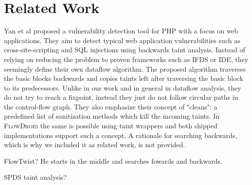 \documentclass[../draft.tex]{subfiles}
\begin{document}
    \chapter{Related Work}
    Yan et al \cite{Yan2017} proposed a vulnerability detection tool for PHP with a focus on web applications. They aim to detect typical web application vulnerabilities such as cross-site-scripting and SQL injections using backwards taint analysis. 
    Instead of relying on reducing the problem to proven frameworks such as IFDS or IDE, they seemingly define their own dataflow algorithm. The proposed algorithm traverses the basic blocks backwards and copies taints left after traversing the basic block to its predecessors. Unlike in our work and in general in dataflow analysis, they do not try to reach a fixpoint, instead they just do not follow circular paths in the control-flow graph. 
    They also emphasize their concept of "cleans": a predefined list of sanitization methods which kill the incoming taints. 
    In \textsc{FlowDroid} the same is possible using taint wrappers and both shipped implementations support such a concept.
    A rationale for searching backwards, which is why we included it as related work, is not provided.

    FlowTwist? He starts in the middle and searches fowards and backwards.

    SPDS taint analysis?
\end{document}
